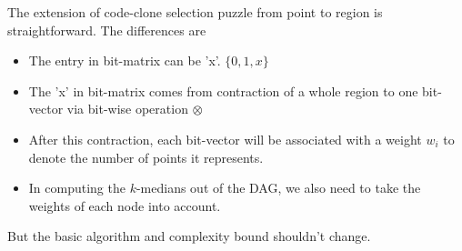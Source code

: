 
The extension of code-clone selection puzzle from point to region is 
straightforward. The differences are

\begin{itemize}
\item The entry in bit-matrix can be 'x'. $\{0, 1, x\}$

\item The 'x' in bit-matrix comes from contraction of a whole region to 
one bit-vector via bit-wise operation $\otimes$

\item After this contraction, each bit-vector will be associated with
a weight $w_i$ to denote the number of points it represents.

\item In computing the $k$-medians out of the {DAG}, we also need to 
take the weights of each node into account. 
\end{itemize}

But the basic algorithm and complexity bound shouldn't change.
